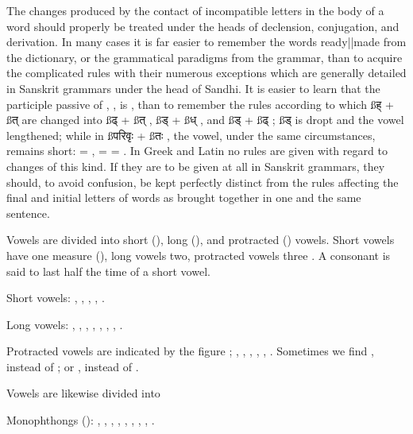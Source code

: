The changes produced by the contact of incompatible letters in the body
of a word should properly be treated under the heads of declension,
conjugation, and derivation. In many cases it is far easier to remember
the words ready||made from the dictionary, or the grammatical paradigms
from the grammar, than to acquire the complicated rules with their
numerous exceptions which are generally detailed in Sanskrit grammars
under the head of Sandhi. It is easier to learn that the participle
passive of , , is ,
than to remember the rules according to which {\ss ह्} + {\ss त्}  are
changed into {\ss ढ्} + {\ss त्} , {\ss ड्} + {\ss ध्} , and
{\ss ड्} + {\ss ढ्} ; {\ss ड्}  is dropt and the vowel
lengthened; while in {\ss परिवृः} + {\ss तः} , the vowel,
under the same circumstances, remains short:  =
,  =  =
. In Greek and Latin no rules are given with regard to
changes of this kind. If they are to be given at all in Sanskrit
grammars, they should, to avoid confusion, be kept perfectly distinct
from the rules affecting the final and initial letters of words as
brought together in one and the same sentence.

\subject[vowelclasses]{Classification of Vowels.}

\s Vowels are divided into short (), long (), and
protracted () vowels. Short vowels have one measure
(), long vowels two, protracted vowels three %
%
%
. A consonant is said to last half the time of a short vowel.

\startitemize[n]
\item Short vowels: , , , ,
  .

\item Long vowels: , , , ,
  , , , .

\item Protracted vowels are indicated by the figure ;
  , , , , ,
  . Sometimes we find , instead of ;
  or , instead of .
\stopitemize

\s Vowels are likewise divided into

\startitemize[n]
\item Monophthongs (): , , ,
  , , , , ,
  .

